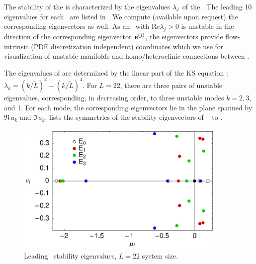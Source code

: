 The stability of the {\eqva} is characterized by the eigenvalues
$\eigExp[j]$ of the \stabmat.  The leading 10 eigenvalues for each
\eqv\ are listed in . We compute (available upon request)
the corresponding eigenvectors as well. As an \eqv\ with $\mathrm{Re}
\lambda_j > 0$ is unstable in the direction of the corresponding
eigenvector $\jEigvec{j}$, the eigenvectors provide flow-intrinsic
(PDE discretization independent) coordinates which we use for visualization
of unstable manifolds and homo/heteroclinic connections between
\eqva.

The eigenvalues of  are determined by the linear part of the KS
equation : $\lambda_k=(k/\tilde{L})^2-(k/\tilde{L})^4$.
For $L=22$, there are three pairs of unstable eigenvalues, corresponding,
in decreasing order, to three unstable modes $k=2,3$, and 1.  For each
mode, the corresponding eigenvectors lie in the plane spanned by
$\Re \, a_k$ and $\Im \, a_k$. 
lists the symmetries of the stability eigenvectors of
\eqva\  to .

\begin{figure}[t]
\begin{center}
\includegraphics[width=4in]{figs/L22-eqvaEigenvalues.eps}
\end{center}
\caption{
Leading  \eqv\ stability eigenvalues,
$L=22$ system size.
}
\label{f:KS22EkEigs}
\end{figure}

